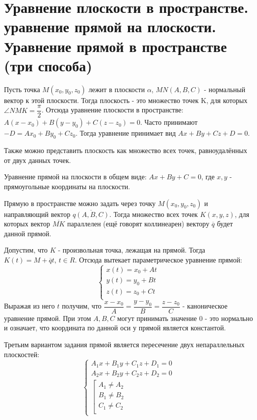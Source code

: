 \documentclass[12pt]{article}
\begin{document}
\begin{sloppypar}
    \section{Уравнение плоскости в пространстве. уравнение прямой на плоскости. Уравнение прямой в пространстве (три способа)}
    Пусть точка $M(x_0, y_0, z_0)$ лежит в плоскости $\alpha$, $MN(A, B, C)$ - нормальный вектор к этой плоскости. Тогда плоскость - это множество точек K, для которых $\angle NMK = \dfrac{\pi}{2}$. Отсюда уравнение плоскости в пространстве: $A(x - x_0) + B(y - y_0) + C(z - z_0) = 0$. Часто принимают $-D = Ax_0 + By_0 + Cz_0$. Тогда уравнение принимает вид $Ax + By + Cz + D = 0$.

    Также можно представить плоскость как множество всех точек, равноудалённых от двух данных точек.

    Уравнение прямой на плоскости в общем виде: $Ax + By + C = 0$, где $x, y$ - прямоугольные координаты на плоскости.

    Прямую в пространстве можно задать через точку $M(x_0, y_0, z_0)$ и направляющий вектор $\overline{q(A, B, C)}$. Тогда множество всех точек $K(x, y, z)$, для которых вектор $\overline{MK}$ параллелен (ещё говорят коллинеарен) вектору $\overline{q}$ будет данной прямой.

    Допустим, что $K$ - произвольная точка, лежащая на прямой. Тогда $K(t) = M + \overline{q}t$, $t \in R$. Отсюда вытекает параметрическое уравнение прямой:
    \[
        \begin{cases}
            x(t) = x_0 + At \\
            y(t) = y_0 + Bt \\
            z(t) = z_0 + Ct \\
        \end{cases}
    \]
    Выражая из него $t$ получим, что $\dfrac{x - x_0}{A} = \dfrac{y - y_0}{B} = \dfrac{z - z_0}{C}$ - каноническое уравнение прямой. При этом $A, B, C$ могут принимать значение 0 - это нормально и означает, что координата по данной оси у прямой является константой.

    Третьим вариантом задания прямой является пересечение двух непараллельных плоскостей:
    \[
        \begin{cases}
            A_1x + B_1y + C_1z + D_1 = 0 \\
            A_2x + B_2y + C_2z + D_2 = 0 \\
            \left[
            \begin{array}{l}
                A_1 \neq A_2 \\
                B_1 \neq B_2 \\
                C_1 \neq C_2 \\
            \end{array} \right.
        \end{cases}
    \]


\end{sloppypar}
\end{document}

